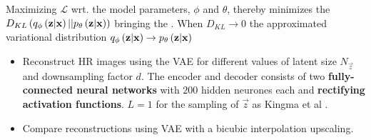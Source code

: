 Maximizing $\mathcal{L}$ wrt. the model parameters, $\phi$ and $\theta$, thereby minimizes the $D_{KL}\left( q_{\phi}\left(\bm{\mathrm{z}}|\bm{\mathrm{x}}\right)||p_{\theta}\left(\bm{\mathrm{z}}|\bm{\mathrm{x}}\right)\right)$ bringing the . When $D_{KL}\rightarrow 0$ the approximated variational distribution $q_{\phi}\left(\bm{\mathrm{z}}|\bm{\mathrm{x}}\right)\rightarrow p_{\theta}\left(\bm{\mathrm{z}}|\bm{\mathrm{x}}\right)$



\begin{itemize}
	\item Reconstruct HR images using the VAE for different values of latent size $N_{\vec{z}}$ and downsampling factor $d$. The encoder and decoder consists of two \textbf{fully-connected neural networks} with $200$ hidden neurones each and \textbf{rectifying activation functions}. $L = 1$ for the sampling of $\vec{z}$ as Kingma et al \cite{Kingma2013}.
	\item Compare reconstructions using VAE with a bicubic interpolation upscaling.
\end{itemize}
